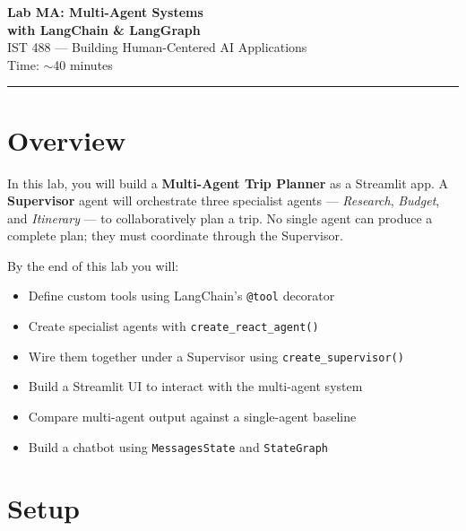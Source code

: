 \documentclass[11pt, letterpaper]{article}
\begin{document}
\begin{center}
  {\Huge\bfseries Lab MA: Multi-Agent Systems}\\[0.4em]
  {\Large\bfseries with LangChain \& LangGraph}\\[1.2em]
  {\large IST 488 --- Building Human-Centered AI Applications}\\[0.5em]
  {\large Time: $\sim$40 minutes}
\end{center}

\vspace{1em}
\hrule
\vspace{1.5em}

\section*{Overview}

In this lab, you will build a \textbf{Multi-Agent Trip Planner} as a Streamlit app. A \textbf{Supervisor} agent will orchestrate three specialist agents --- \textit{Research}, \textit{Budget}, and \textit{Itinerary} --- to collaboratively plan a trip. No single agent can produce a complete plan; they must coordinate through the Supervisor.

\medskip
\noindent By the end of this lab you will:
\begin{itemize}[nosep]
  \item Define custom tools using LangChain's \texttt{@tool} decorator
  \item Create specialist agents with \texttt{create\_react\_agent()}
  \item Wire them together under a Supervisor using \texttt{create\_supervisor()}
  \item Build a Streamlit UI to interact with the multi-agent system
  \item Compare multi-agent output against a single-agent baseline
  \item Build a chatbot using \texttt{MessagesState} and \texttt{StateGraph}
\end{itemize}

\section*{Setup}
\end{document}
